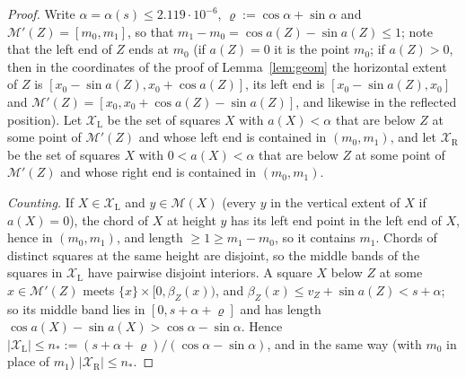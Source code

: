 \documentclass[11pt]{amsart}
\theoremstyle{definition}
\theoremstyle{remark}
\begin{document}
\begin{proof}
Write $\alpha=\alpha(s)\le2.119\cdot10^{-6}$, $\varrho:=\cos\alpha+\sin\alpha$ and $\mathcal M'(Z)=[m_0,m_1]$, so that
$m_1-m_0=\cos a(Z)-\sin a(Z)\le1$; note that the left end of $Z$ ends at $m_0$ (if $a(Z)=0$ it is the point $m_0$; if $a(Z)>0$,
then in the coordinates of the proof of Lemma~\ref{lem:geom} the horizontal extent of $Z$ is $[x_0-\sin a(Z),x_0+\cos a(Z)]$, its left end
is $[x_0-\sin a(Z),x_0]$ and $\mathcal M'(Z)=[x_0,x_0+\cos a(Z)-\sin a(Z)]$, and likewise in the reflected position). Let $\mathcal X_{\mathrm L}$ be the set of squares $X$ with
$a(X)<\alpha$ that are below $Z$ at some point of $\mathcal M'(Z)$ and whose left end is contained in $(m_0,m_1)$, and let
$\mathcal X_{\mathrm R}$ be the set of squares $X$ with $0<a(X)<\alpha$ that are below $Z$ at some point of $\mathcal M'(Z)$ and whose right end
is contained in $(m_0,m_1)$.

\emph{Counting.} If $X\in\mathcal X_{\mathrm L}$ and $y\in\mathcal M(X)$ \textup{(}every $y$ in the vertical extent of $X$ if $a(X)=0$\textup{)}, the
chord of $X$ at height $y$ has its left end point in the left end of $X$, hence in $(m_0,m_1)$, and length $\ge1\ge m_1-m_0$, so it
contains $m_1$. Chords of distinct squares at the same height are disjoint, so the middle bands of the squares in $\mathcal X_{\mathrm L}$
have pairwise disjoint interiors. A square $X$ below $Z$ at some $x\in\mathcal M'(Z)$ meets $\{x\}\times[0,\beta_Z(x))$, and
$\beta_Z(x)\le v_Z+\sin a(Z)<s+\alpha$; so its middle band lies in $[0,s+\alpha+\varrho]$ and has length $\cos a(X)-\sin a(X)>
\cos\alpha-\sin\alpha$. Hence $|\mathcal X_{\mathrm L}|\le n_*:=(s+\alpha+\varrho)/(\cos\alpha-\sin\alpha)$, and in the same way (with $m_0$ in
place of $m_1$) $|\mathcal X_{\mathrm R}|\le n_*$.


\end{proof}
\end{document}
